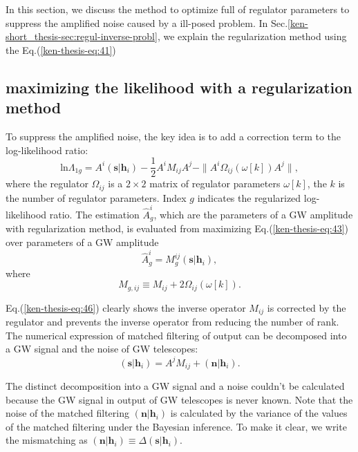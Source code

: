 \documentclass[%
 aps,
 prd,
 amsmath,amssymb,
 reprint,%
superscriptaddress
]{revtex4-1}
\begin{document}
In this section, we discuss the method to optimize full of regulator parameters to suppress the amplified noise caused by a ill-posed problem. In Sec.\ref{ken-short_thesis-sec:regul-inverse-probl}, we explain the regularization method using the Eq.(\ref{ken-thesis-eq:41})

\subsection{maximizing the likelihood with a regularization method}\label{ken-short_thesis-sec:maxim-likel-with}
To suppress the amplified noise, the key idea is to add a correction term to the log-likelihood ratio:
\begin{equation}\label{ken-thesis-eq:43}
  \mathrm{ln}\Lambda_{1g}=A^{i}(\bm{s}|\bm{h}_{i})-\frac{1}{2}A^{i}M_{ij}A^{j} - \|A^{i}\Omega_{ij}(\omega[k])A^{j}\|,
\end{equation}
where the regulator
$\Omega_{ij}$ is a
$2\times 2$ matrix of regulator parameters
$\omega[k]$,
the
$k$ is the number of regulator parameters. Index
$g$ indicates the regularized log-likelihood ratio. The estimation
$\hat{A}^{i}_{g}$, which are the parameters of a GW amplitude with regularization method, is evaluated from maximizing Eq.(\ref{ken-thesis-eq:43}) over parameters of a GW amplitude
\begin{equation}\label{ken-thesis-eq:45}
 \hat{A}_{g}^{i} = M_{g}^{ij}(\bm{s}|\bm{h}_{i}),
\end{equation}
where
\begin{equation}\label{ken-thesis-eq:46}
 M_{g,ij}\equiv M_{ij} + 2\Omega_{ij}(\omega[k]).
\end{equation}

Eq.(\ref{ken-thesis-eq:46}) clearly shows the inverse operator
$M_{ij}$ is corrected by the regulator and prevents the inverse operator from reducing the number of rank. The numerical expression of matched filtering of output can be decomposed into a GW signal and the noise of GW telescopes:
\begin{equation}\label{ken-thesis-eq:47}
 (\bm{s}|\bm{h}_{i}) = A^{j}M_{ij} + (\bm{n}|\bm{h}_{i}).
\end{equation}

The distinct decomposition into a GW signal and a noise couldn't be calculated because the GW signal in output of GW telescopes is never known. Note that the noise of the matched filtering
$(\bm{n}|\bm{h}_{i})$ is calculated by the variance of the values of the matched filtering under the Bayesian inference. To make it clear, we write the mismatching as
$(\bm{n}|\bm{h}_{i}) \equiv \Delta(\bm{s}|\bm{h}_{i})$.
\end{document}
